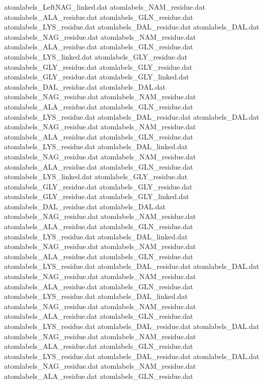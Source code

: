 atomlabels_LeftNAG_linked.dat   
atomlabels_NAM_residue.dat      
atomlabels_ALA_residue.dat      
atomlabels_GLN_residue.dat      
atomlabels_LYS_residue.dat      
atomlabels_DAL_residue.dat      
atomlabels_DAL.dat              
atomlabels_NAG_residue.dat      
atomlabels_NAM_residue.dat      
atomlabels_ALA_residue.dat      
atomlabels_GLN_residue.dat      
atomlabels_LYS_linked.dat       
atomlabels_GLY_residue.dat
atomlabels_GLY_residue.dat
atomlabels_GLY_residue.dat
atomlabels_GLY_residue.dat
atomlabels_GLY_linked.dat
atomlabels_DAL_residue.dat      
atomlabels_DAL.dat              
atomlabels_NAG_residue.dat      
atomlabels_NAM_residue.dat      
atomlabels_ALA_residue.dat      
atomlabels_GLN_residue.dat      
atomlabels_LYS_residue.dat      
atomlabels_DAL_residue.dat      
atomlabels_DAL.dat              
atomlabels_NAG_residue.dat      
atomlabels_NAM_residue.dat      
atomlabels_ALA_residue.dat      
atomlabels_GLN_residue.dat      
atomlabels_LYS_residue.dat      
atomlabels_DAL_linked.dat       
atomlabels_NAG_residue.dat      
atomlabels_NAM_residue.dat      
atomlabels_ALA_residue.dat      
atomlabels_GLN_residue.dat      
atomlabels_LYS_linked.dat       
atomlabels_GLY_residue.dat
atomlabels_GLY_residue.dat
atomlabels_GLY_residue.dat
atomlabels_GLY_residue.dat
atomlabels_GLY_linked.dat
atomlabels_DAL_residue.dat      
atomlabels_DAL.dat              
atomlabels_NAG_residue.dat      
atomlabels_NAM_residue.dat      
atomlabels_ALA_residue.dat      
atomlabels_GLN_residue.dat      
atomlabels_LYS_residue.dat      
atomlabels_DAL_linked.dat       
atomlabels_NAG_residue.dat      
atomlabels_NAM_residue.dat      
atomlabels_ALA_residue.dat      
atomlabels_GLN_residue.dat      
atomlabels_LYS_residue.dat      
atomlabels_DAL_residue.dat      
atomlabels_DAL.dat              
atomlabels_NAG_residue.dat      
atomlabels_NAM_residue.dat      
atomlabels_ALA_residue.dat      
atomlabels_GLN_residue.dat      
atomlabels_LYS_residue.dat      
atomlabels_DAL_linked.dat       
atomlabels_NAG_residue.dat      
atomlabels_NAM_residue.dat      
atomlabels_ALA_residue.dat      
atomlabels_GLN_residue.dat      
atomlabels_LYS_residue.dat      
atomlabels_DAL_residue.dat      
atomlabels_DAL.dat              
atomlabels_NAG_residue.dat      
atomlabels_NAM_residue.dat      
atomlabels_ALA_residue.dat      
atomlabels_GLN_residue.dat      
atomlabels_LYS_residue.dat      
atomlabels_DAL_residue.dat      
atomlabels_DAL.dat              
atomlabels_NAG_residue.dat      
atomlabels_NAM_residue.dat      
atomlabels_ALA_residue.dat      
atomlabels_GLN_residue.dat      
